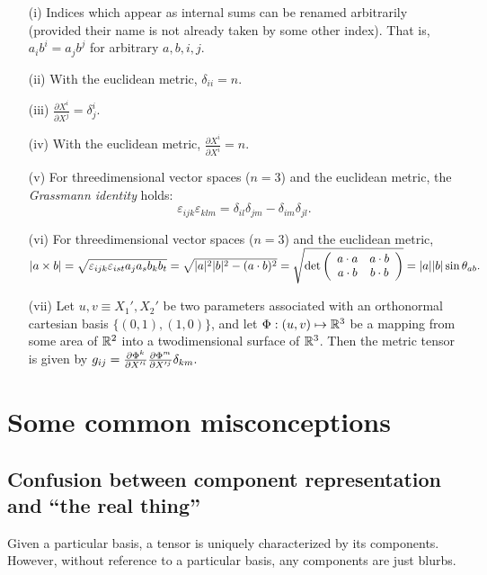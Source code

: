 \begin{itemize}
\item[(i)]
Indices which appear as internal sums can be renamed arbitrarily
(provided their name is not already taken by some other index).
That is, $a_ib^i=a_jb^j$ for arbitrary $a,b,i,j$.
\item[(ii)]
With the euclidean metric, $\delta_{ii}=n$.
\item[(iii)]
$\frac{\partial X^i }{\partial X^j}=\delta^i_j$.
\item[(iv)]
With the euclidean metric, $\frac{\partial X^i }{ \partial X^i}=n$.
\item[(v)]
For threedimensional vector spaces ($n=3$)  and the euclidean metric,
the {\em Grassmann identity} holds:
\begin{equation}
 \varepsilon_{ijk}\varepsilon_{klm}
=  \delta_{il}\delta_{jm}-\delta_{im}\delta_{jl}.
\label{2011-m-egi}
\end{equation}
\item[(vi)]
For threedimensional vector spaces ($n=3$) and the euclidean metric,\\
$\vert a\times b \vert=
\sqrt{\varepsilon_{ijk}\varepsilon_{ist}a_ja_sb_kb_t}  =
\sqrt{\vert a\vert^2
\vert b\vert^2
-(a\cdot b)^2}=\sqrt{{\rm det}
\left(
\begin{array}{cc}
a\cdot a&a\cdot b\\
a\cdot b&b\cdot b
\end{array}\right)}= \vert a\vert
\vert b\vert \sin \theta_{ab}.$
\item[(vii)]
Let $u,v\equiv X_1',X_2'$ be two parameters associated with an
orthonormal cartesian basis $\{(0,1),(1,0)\}$, and let
$\Phi :(u,v)\mapsto {\Bbb R}^3$
be a mapping from some area of ${\Bbb R}^2$ into a twodimensional
surface of ${\Bbb R}^3$. Then the metric tensor is given by
$g_{ij}=
{\partial \Phi^k \over \partial X'^i}
{\partial \Phi^m \over \partial X'^j} \delta_{km}.$

\end{itemize}




\section{Some common misconceptions}

\subsection{Confusion between component representation and ``the real thing''}
Given a particular basis, a tensor is uniquely characterized by its components.
However, without reference to a particular basis, any components are just blurbs.

